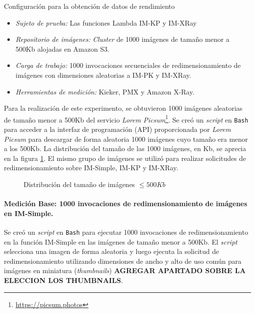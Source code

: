 Configuración para la obtención de datos de rendimiento

\begin{itemize}
    \item \emph{Sujeto de prueba:} Las funciones Lambda IM-KP y IM-XRay
    \item \emph{Repositorio de imágenes:} \emph{Cluster} de 1000 imágenes de tamaño menor a 500Kb alojadas en Amazon S3.     
    \item \emph{Carga de trabajo:} 1000 invocaciones secuenciales de redimensionamiento de imágenes con dimensiones aleatorias a IM-PK y IM-XRay.
    \item \emph{Herramientas de medición:} Kieker, PMX y Amazon X-Ray.
\end{itemize}

Para la realización de este experimento, se obtuvieron 1000 imágenes aleatorias de tamaño menor a 500Kb del servicio \emph{Lorem Picsum}\footnote{\url{https://picsum.photos}}. Se creó un \emph{script} en \texttt{Bash} para acceder a la interfaz de programación (API) proporcionada por \emph{Lorem Picsum} para descargar de forma aleatoria 1000 imágenes cuyo tamaño era menor a los 500Kb. La distribución del tamaño de las 1000 imágenes, en Kb, se aprecia en la figura \ref{fig:distribucion-tamanno-imagenes-hasta-500kb}. El mismo grupo de imágenes se utilizó para realizar solicitudes de redimensionamiento sobre IM-Simple, IM-KP y IM-XRay.

\begin{figure}
\caption{Distribución del tamaño de imágenes $\leq 500Kb$}
\label{fig:distribucion-tamanno-imagenes-hasta-500kb}
\end{figure}

\paragraph{Medición Base: 1000 invocaciones de redimensionamiento de imágenes en IM-Simple.} 
Se creó un \emph{script} en \texttt{Bash} para ejecutar 1000 invocaciones de redimensionamiento en la función IM-Simple en las imágenes de tamaño menor a 500Kb. El \emph{script} selecciona una imagen de forma aleatoria y luego ejecuta la solicitud de redimensionamiento utilizando dimensiones de ancho y alto de uso común para imágenes en miniatura (\emph{thumbnails}) \textbf{AGREGAR APARTADO SOBRE LA ELECCION LOS THUMBNAILS}.

